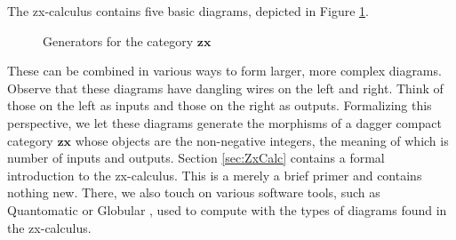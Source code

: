 \documentclass[11pt]{amsart}
\newcommand{\cat}[1]{\mathbf{#1}}
\theoremstyle{remark}
\theoremstyle{definition}
\begin{document}
The zx-calculus contains five basic diagrams, depicted in Figure \ref{fig:ZX generators}.
\begin{figure}
	\caption{Generators for the category $\cat{zx}$}
	\label{fig:ZX generators}
\end{figure}
These can be combined in various ways to form larger, more complex diagrams.   Observe that these diagrams have dangling wires on the left and right. Think of those on the left as inputs and those on the right as outputs.  Formalizing this perspective, we let these diagrams generate the morphisms of a dagger compact category $\cat{zx}$ whose objects are the non-negative integers, the meaning of which is number of inputs and outputs.  Section \ref{sec:ZxCalc} contains a formal introduction to the zx-calculus.  This is a merely a brief primer and contains nothing new.  There, we also touch on various software tools, such as Quantomatic \cite{BarKissingerVicary_Globular,DixonDuncanKissinger_QuantomaticWebsite} or Globular \cite{BarKissingerVicary_Globular}, used to compute with the types of diagrams found in the zx-calculus.  
\end{document}
